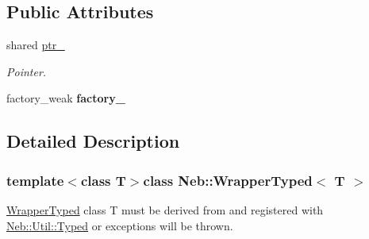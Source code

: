 \subsection*{\-Public \-Attributes}
\begin{DoxyCompactItemize}
\item 
\hypertarget{classNeb_1_1WrapperTyped_a92ba07879ca9c2072d7dd2b5acb9d7f5}{shared \hyperlink{classNeb_1_1WrapperTyped_a92ba07879ca9c2072d7dd2b5acb9d7f5}{ptr\-\_\-}}\label{classNeb_1_1WrapperTyped_a92ba07879ca9c2072d7dd2b5acb9d7f5}

\begin{DoxyCompactList}\small\item\em \-Pointer. \end{DoxyCompactList}\item 
\hypertarget{classNeb_1_1WrapperTyped_abd7867968e08d0ea4e3d681715e6684d}{factory\-\_\-weak {\bfseries factory\-\_\-}}\label{classNeb_1_1WrapperTyped_abd7867968e08d0ea4e3d681715e6684d}

\end{DoxyCompactItemize}


\subsection{\-Detailed \-Description}
\subsubsection*{template$<$class \-T$>$class Neb\-::\-Wrapper\-Typed$<$ T $>$}

\hyperlink{classNeb_1_1WrapperTyped}{\-Wrapper\-Typed} class \-T must be derived from and registered with \hyperlink{classNeb_1_1Util_1_1Typed}{\-Neb\-::\-Util\-::\-Typed} or exceptions will be thrown. 

